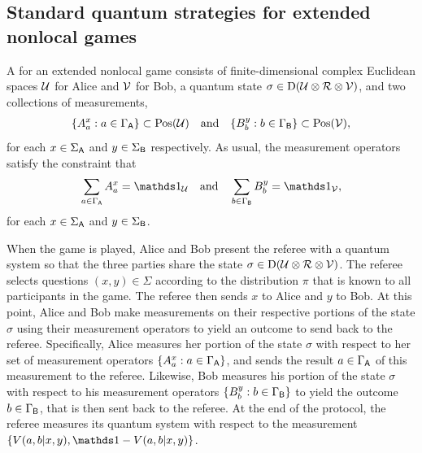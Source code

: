 %

\subsection{Standard quantum strategies for extended nonlocal games} \label{sec:standard-quantum-strategies-extended-nonlocal-games}

A  for an extended nonlocal game consists of finite-dimensional complex Euclidean spaces $\mathcal{U}$ for Alice and $\mathcal{V}$ for Bob, a quantum state $\sigma \in \mathrm{D}(\mathcal{U} \otimes \mathcal{R} \otimes \mathcal{V})$, and two collections of measurements, 
\begin{align}
	\{ A_a^x : a \in \Gamma_{\mathsf{A}} \} \subset \mathrm{Pos}(\mathcal{U}) \quad \textnormal{and} \quad \{ B_b^y : b \in \Gamma_{\mathsf{B}} \} \subset \mathrm{Pos}(\mathcal{V}),
\end{align}
for each $x \in \Sigma_{\mathsf{A}}$ and $y \in \Sigma_{\mathsf{B}}$ respectively. As usual, the measurement operators satisfy the constraint that 
\begin{align}
	\sum_{a \in \GammaA} A_a^x = \I_{\U} \quad \textnormal{and} \quad \sum_{b \in \GammaB} B_b^y = \I_{\V},
\end{align}
for each $x \in \Sigma_{\mathsf{A}}$ and $y \in \Sigma_{\mathsf{B}}$. 

When the game is played, Alice and Bob present the referee with a quantum system so that the three parties share the state $\sigma \in \mathrm{D}(\mathcal{U} \otimes \mathcal{R} \otimes \mathcal{V})$. The referee selects questions $(x,y) \in \Sigma$ according to the distribution $\pi$ that is known to all participants in the game. The referee then sends $x$ to Alice and $y$ to Bob. At this point, Alice and Bob make measurements on their respective portions of the state $\sigma$ using their measurement operators to yield an outcome to send back to the referee. Specifically, Alice measures her portion of the state $\sigma$ with respect to her set of measurement operators $\{A_a^x : a \in \Gamma_{\mathsf{A}}\}$, and sends the result $a \in \Gamma_{\mathsf{A}}$ of this measurement to the referee. Likewise, Bob measures his portion of the state $\sigma$ with respect to his measurement operators $\{ B_b^y : b \in \Gamma_{\mathsf{B}} \}$ to yield the outcome $b \in \Gamma_{\mathsf{B}}$, that is then sent back to the referee. At the end of the protocol, the referee measures its quantum system with respect to the measurement $\{ V(a,b|x,y), \I - V(a,b|x,y) \}$. 

